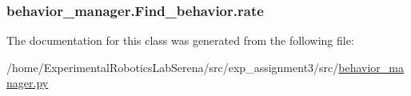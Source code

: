 \subsubsection[{\texorpdfstring{rate}{rate}}]{\setlength{\rightskip}{0pt plus 5cm}behavior\+\_\+manager.\+Find\+\_\+behavior.\+rate}\hypertarget{classbehavior__manager_1_1Find__behavior_a3671a945907edc316dcc8dd00a219268}{}\label{classbehavior__manager_1_1Find__behavior_a3671a945907edc316dcc8dd00a219268}


The documentation for this class was generated from the following file\+:\begin{DoxyCompactItemize}
\item 
/home/\+Experimental\+Robotics\+Lab\+Serena/src/exp\+\_\+assignment3/src/\hyperlink{behavior__manager_8py}{behavior\+\_\+manager.\+py}\end{DoxyCompactItemize}
